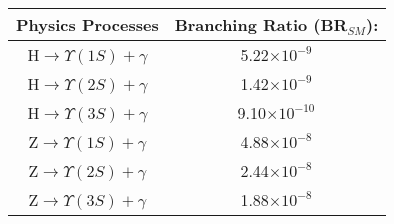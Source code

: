 \begin{tabular}{|c|c|}
\hline
Physics Processes & Branching Ratio (BR$_{SM}$): \\ \hline
H$\rightarrow  \Upsilon(1S) +\gamma$ & 5.22$\times 10^{-9}$ \\ \hline
H$\rightarrow  \Upsilon(2S) +\gamma$ & 1.42$\times 10^{-9}$ \\ \hline
H$\rightarrow  \Upsilon(3S) +\gamma$ & 9.10$\times 10^{-10}$ \\ \hline \hline
Z$\rightarrow  \Upsilon(1S) +\gamma$ & 4.88$\times 10^{-8}$ \\ \hline
Z$\rightarrow  \Upsilon(2S) +\gamma$ & 2.44$\times 10^{-8}$ \\ \hline
Z$\rightarrow  \Upsilon(3S) +\gamma$ & 1.88$\times 10^{-8}$ \\ \hline 

\end{tabular}

